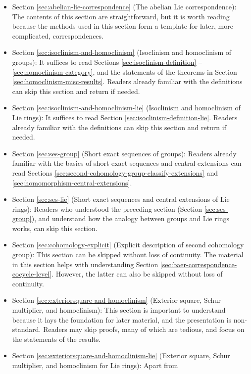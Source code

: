 \documentclass{ucetd}
\begin{document}
\begin{itemize}
\item Section \ref{sec:abelian-lie-correspondence} (The abelian Lie
  correspondence): The contents of this section are straightforward,
  but it is worth reading because the methods used in this section
  form a template for later, more complicated, correspondences.
\item Section \ref{sec:isoclinism-and-homoclinism} (Isoclinism and
  homoclinism of groups): It suffices to read Sections
  \ref{sec:isoclinism-definition} -- \ref{sec:homoclinism-category}, and
  the statements of the theorems in Section
  \ref{sec:homoclinism-misc-results}. Readers already familiar with
  the definitions can skip this section and return if needed.
\item Section \ref{sec:isoclinism-and-homoclinism-lie} (Isoclinism and
  homoclinism of Lie rings): It suffices to read Section
  \ref{sec:isoclinism-definition-lie}. Readers already familiar with
  the definitions can skip this section and return if needed.
\item Section \ref{sec:ses-group} (Short exact sequences of groups):
  Readers already familiar with the basics of short exact sequences
  and central extensions can read Sections
  \ref{sec:second-cohomology-group-classify-extensions} and
  \ref{sec:homomorphism-central-extensions}.
\item Section \ref{sec:ses-lie} (Short exact sequences and central
  extensions of Lie rings): Readers who understood the preceding
  section (Section \ref{sec:ses-group}), and understand how the
  analogy between groups and Lie rings works, can skip this section.
\item Section \ref{sec:cohomology-explicit} (Explicit description of
  second cohomology group): This section can be skipped without loss
  of continuity. The material in this section helps with understanding
  Section \ref{sec:baer-correspondence-cocycle-level}. However, the
  latter can also be skipped without loss of continuity.
\item Section \ref{sec:exteriorsquare-and-homoclinism} (Exterior
  square, Schur multiplier, and homoclinism): This section is
  important to understand because it lays the foundation for later
  material, and the presentation is non-standard. Readers may skip
  proofs, many of which are tedious, and focus on the statements of
  the results.
\item Section \ref{sec:exteriorsquare-and-homoclinism-lie} (Exterior
  square, Schur multiplier, and homoclinism for Lie rings): Apart from

\end{itemize}
\end{document}
